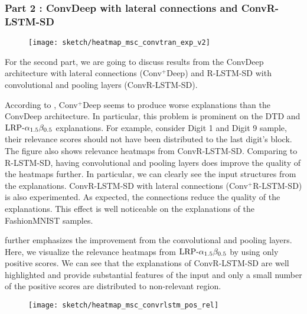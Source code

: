\subsubsection{Part 2 : ConvDeep with lateral connections and ConvR-LSTM-SD}
 \begin{figure}[!htb]
\centering
\texttt{[image: sketch/heatmap\_msc\_convtran\_exp\_v2]}
\label{fig:heatmap_msc_convtran_exp}
\end{figure}
For the second part, we are going to discuss results from the ConvDeep architecture with lateral connections (Conv$^+$Deep) and R-LSTM-SD with convolutional and pooling layers (ConvR-LSTM-SD).

According to \addfigure{\ref{fig:heatmap_msc_convtran_exp}}, Conv$^+$Deep seems to produce worse explanations than the ConvDeep architecture. In particular, this problem is prominent on the DTD and $\text{LRP-}\alpha_{1.5}\beta_{0.5}$ explanations. For example, consider Digit 1 and Digit 9 sample, their relevance scores should not have been distributed to the last digit's block. The figure also shows relevance heatmaps from ConvR-LSTM-SD. Comparing to R-LSTM-SD, having convolutional and pooling layers does improve  the quality of the heatmaps further. In particular, we can clearly see the input structures from the explanations.  ConvR-LSTM-SD with lateral connections (Conv$^+$R-LSTM-SD) is also experimented. As expected, the connections reduce the quality of the explanations. This effect is well noticeable on the explanations of the FashionMNIST samples.

\addfigure{\ref{fig:heatmap_msc_convrlstm_pos_rel}} further emphasizes the improvement from the convolutional and pooling layers. Here, we visualize the relevance heatmaps from $\text{LRP-}\alpha_{1.5}\beta_{0.5}$ by using only positive scores. We can see that the explanations of ConvR-LSTM-SD are well highlighted and provide substantial features of the input and only a small number of the positive scores are distributed to non-relevant region.



 \begin{figure}[!htb]
\centering
\texttt{[image: sketch/heatmap\_msc\_convrlstm\_pos\_rel]}
\label{fig:heatmap_msc_convrlstm_pos_rel}
\end{figure}

